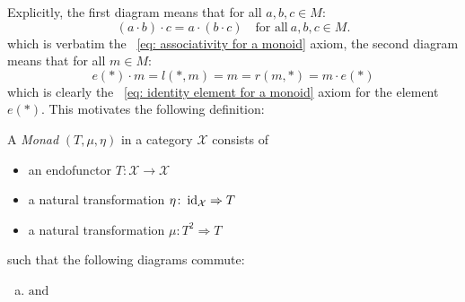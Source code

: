 Explicitly, the first diagram means that for all $a,b,c \in M$:
\[
    (a \cdot b) \cdot c = a \cdot (b \cdot c) 
    \quad \text{for all} \ a,b,c \in M.
\]
which is verbatim the ~\ref{eq: associativity for a monoid} axiom, the second diagram means that for all $m \in M$:
\[
  e(\ast) \cdot m = l(\ast,m) = m = r(m,\ast) = m \cdot e(\ast)  
\]
which is clearly the ~\ref{eq: identity element for a monoid} axiom 
for the element $e(\ast)$.
This motivates the following definition: 
\begin{definition}[Monad]
    A \textit{Monad} $(T,\mu, \eta) $ in a category $\mathcal{X}$ consists of
    \begin{itemize}
        \item an endofunctor $T\colon \mathcal{X} \to \mathcal{X}$
        \item a natural transformation $\eta \colon \operatorname{id}_\mathcal{X} \Rightarrow T$ 
        \item a natural transformation $\mu\colon T^2 \Rightarrow T $
    \end{itemize}  
    such that the following diagrams commute:
    \begin{enumerate}[(a)]
    \item 
    \begin{minipage}{0.4\linewidth}
    \centering
    \end{minipage}
    $\mathrm{and}$
    \begin{minipage}{0.4\linewidth}
    \centering
    \end{minipage}
\end{enumerate}
\end{definition}


